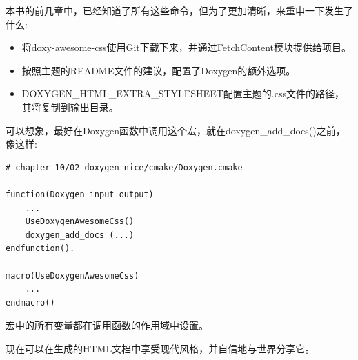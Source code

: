 本书的前几章中，已经知道了所有这些命令，但为了更加清晰，来重申一下发生了什么:

\begin{itemize}
\item 
将doxy-awesome-css使用Git下载下来，并通过FetchContent模块提供给项目。

\item 
按照主题的README文件的建议，配置了Doxygen的额外选项。

\item 
DOXYGEN\_HTML\_EXTRA\_STYLESHEET配置主题的.css文件的路径，其将复制到输出目录。
\end{itemize}

可以想象，最好在Doxygen函数中调用这个宏，就在doxygen\_add\_docs()之前，像这样:

\begin{lstlisting}[style=styleCMake]
# chapter-10/02-doxygen-nice/cmake/Doxygen.cmake

function(Doxygen input output)
	...
	UseDoxygenAwesomeCss()
	doxygen_add_docs (...)
endfunction().

macro(UseDoxygenAwesomeCss)
	...
endmacro()
\end{lstlisting}

宏中的所有变量都在调用函数的作用域中设置。

现在可以在生成的HTML文档中享受现代风格，并自信地与世界分享它。















